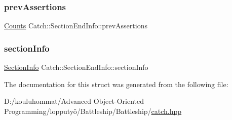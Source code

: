 \subsubsection{\texorpdfstring{prev\+Assertions}{prevAssertions}}
{\footnotesize\ttfamily \mbox{\hyperlink{struct_catch_1_1_counts}{Counts}} Catch\+::\+Section\+End\+Info\+::prev\+Assertions}

\mbox{\label{struct_catch_1_1_section_end_info_a2d44793392cb83735d086d726822abe9}} 
\subsubsection{\texorpdfstring{section\+Info}{sectionInfo}}
{\footnotesize\ttfamily \mbox{\hyperlink{struct_catch_1_1_section_info}{Section\+Info}} Catch\+::\+Section\+End\+Info\+::section\+Info}



The documentation for this struct was generated from the following file\+:\begin{DoxyCompactItemize}
\item 
D\+:/kouluhommat/\+Advanced Object-\/\+Oriented Programming/lopputyö/\+Battleship/\+Battleship/\mbox{\hyperlink{catch_8hpp}{catch.\+hpp}}\end{DoxyCompactItemize}
